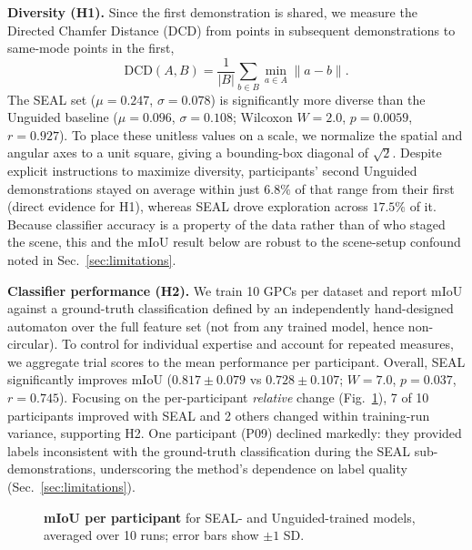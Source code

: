 \textbf{Diversity (H1).} Since the first demonstration is shared, we measure the Directed Chamfer Distance (DCD) from points in subsequent demonstrations to same-mode points in the first,
$$\text{DCD}(A,B)=\frac{1}{|B|}\sum_{b\in B}\min_{a\in A}\|a-b\|.$$
The SEAL set ($\mu{=}0.247$, $\sigma{=}0.078$) is significantly more diverse than the Unguided baseline ($\mu{=}0.096$, $\sigma{=}0.108$; Wilcoxon $W{=}2.0$, $p{=}0.0059$, $r{=}0.927$). To place these unitless values on a scale, we normalize the spatial and angular axes to a unit square, giving a bounding-box diagonal of $\sqrt{2}$. Despite explicit instructions to maximize diversity, participants' second Unguided demonstrations stayed on average within just $6.8\%$ of that range from their first (direct evidence for H1), whereas SEAL drove exploration across $17.5\%$ of it. Because classifier accuracy is a property of the data rather than of who staged the scene, this and the mIoU result below are robust to the scene-setup confound noted in Sec.~\ref{sec:limitations}.

\textbf{Classifier performance (H2).} We train 10 GPCs per dataset and report mIoU against a ground-truth classification defined by an independently hand-designed automaton over the full feature set (not from any trained model, hence non-circular). To control for individual expertise and account for repeated measures, we aggregate trial scores to the mean performance per participant. Overall, SEAL significantly improves mIoU ($0.817 \pm 0.079$ vs $0.728 \pm 0.107$; $W{=}7.0$, $p{=}0.037$, $r{=}0.745$). Focusing on the per-participant \emph{relative} change (Fig.~\ref{fig:participant_perf}), 7 of 10 participants improved with SEAL and 2 others changed within training-run variance, supporting H2. One participant (P09) declined markedly: they provided labels inconsistent with the ground-truth classification during the SEAL sub-demonstrations, underscoring the method's dependence on label quality (Sec.~\ref{sec:limitations}).


\begin{figure}[htbp]
\centering

\caption{\textbf{User preferences:} more users prefer SEAL guidance over Unguided demonstrations on Comfort, Trust, and Perceived Effectiveness in a head-to-head comparison ($N{=}10$; no participant chose ``Both'').}
\label{fig:user_pref}

\vspace{2em} %


\caption{\textbf{mIoU per participant} for SEAL- and Unguided-trained models, averaged over 10 runs; error bars show $\pm1$ SD.}
\label{fig:participant_perf}
\end{figure}

